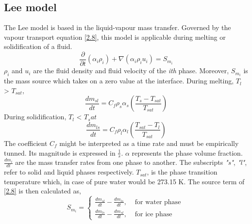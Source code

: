 \subsection{Lee model}
The Lee model is based in the liquid-vapour mass transfer. Governed by the vapour transport equation \ref{2.8}, this model is applicable during melting or solidification of a fluid.
\begin{equation}
\frac{\partial}{\partial t}\left(\alpha_{i} \rho_{i}\right)+\nabla\left(\alpha_{i} \rho_{i} {u}_{i}\right)=S_{m _i}
\label{2.8}
\end{equation}
\textit{$\rho_i$} and \textbf{$u_i$} are the fluid density and fluid velocity of the \textit{i{th}} phase. Moreover, $S_{m_i}$ is the mass source which takes on a zero value at the interface.
\newline
During melting, $T_l$ > $T_{sat}$,
\begin{equation}
\frac{d m_{s l}}{d t}=C_{f} \rho_{s} \alpha_{s}\left(\frac{T_{s}-T_{s a t}}{T_{s a t}}\right)
\label{2.9}
\end{equation}
During solidification, $T_l$ < $T_sat$
\begin{equation}
\label{2.10}
\frac{d m_{l s}}{d t}=C_{f} \rho_{l} \alpha_{l}\left(\frac{T_{s a t}-T_{l}}{T_{s a t}}\right)
\end{equation}
The coefficient $C_f$ might be interpreted as a time rate and must be empirically tunned. Its magnitude is expressed in $\frac{1}{s}$. $\alpha$ represents the phase volume fraction. $\frac{d m_{i}}{d t}$ are the mass transfer rates from one phase to another. The subscripts \textit{"s"}, \textit{"l"}, refer to solid and liquid phases respectively. \textit{$T_{sat}$}, is the phase transition temperature which, in case of pure water would be 273.15 K.
The source term of \ref{2.8} is then calculated as,
\begin{equation}
\label{2.11}
S_{m_{i}}=\left\{\begin{array}{lr}
\frac{d m_{s l}}{d t}-\frac{d m_{l s}}{d t}, & \text { for water phase } \\
\frac{d m_{l s}}{d t}-\frac{d m_{s l}}{d t}, & \text { for ice phase }
\end{array}\right.
\end{equation}  
